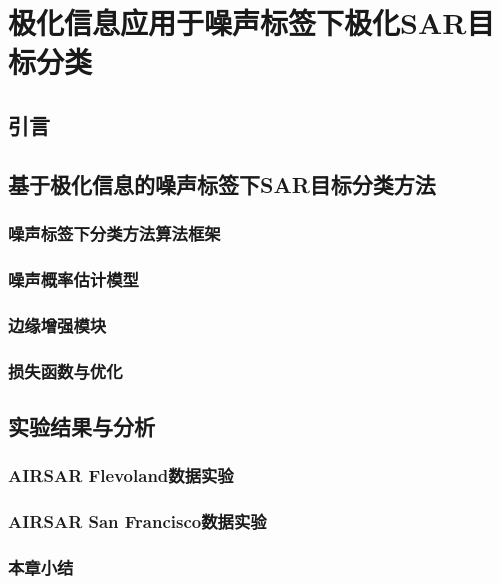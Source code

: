 \chapter{极化信息应用于噪声标签下极化SAR目标分类}
\section{引言}
\section{基于极化信息的噪声标签下SAR目标分类方法}
\subsection{噪声标签下分类方法算法框架}
\subsection{噪声概率估计模型}
\subsection*{边缘增强模块}
\subsection*{损失函数与优化}
\section{实验结果与分析}
\subsection{AIRSAR Flevoland数据实验}
\subsection{AIRSAR San Francisco数据实验}
\subsection*{本章小结}
